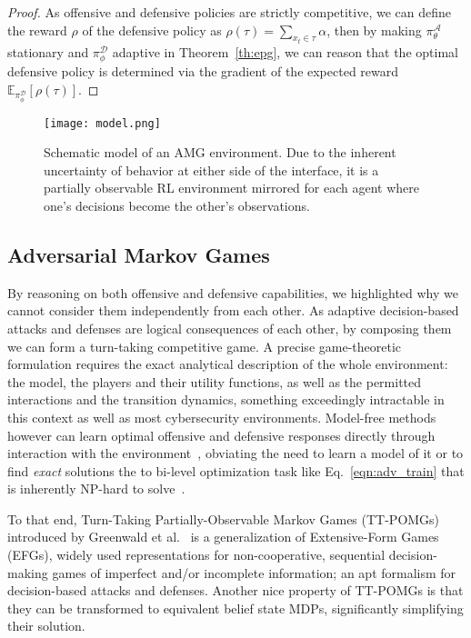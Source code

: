 \begin{proof}
As offensive and defensive policies are strictly competitive, we can define the reward $\rho$ of the defensive policy as $\rho(\tau) = \sum_{x_t \in \tau} \alpha$, then by making $\pi_\theta^\mathcal{A}$ stationary and $\pi_\phi^{\mathcal{D}}$ adaptive in Theorem~\ref{th:epg}, we can reason that the optimal defensive policy is determined via the gradient of the expected reward $\mathbb{E}_{\pi^\mathcal{D}_\phi}[\rho(\tau)]$.
\end{proof}

\begin{figure}
    \centering
    \texttt{[image: model.png]}
    \caption{Schematic model of an AMG environment. Due to the inherent uncertainty of behavior at either side of the interface, it is a partially observable RL environment mirrored for each agent where one's decisions become the other's observations.}
    \label{fig:model}
\end{figure}

\subsection{Adversarial Markov Games}
\label{sec:AMG}

By reasoning on both offensive and defensive capabilities, we highlighted why we cannot consider them independently from each other.
As adaptive decision-based attacks and defenses are logical consequences of each other, by composing them we can form a turn-taking competitive game.
A precise game-theoretic formulation requires the exact analytical description of the whole environment: the model, the players and their utility functions, as well as the permitted interactions and the transition dynamics, something exceedingly intractable in this context as well as most cybersecurity environments.
Model-free methods however can learn optimal offensive and defensive responses directly through interaction with the environment~\cite{sengupta2020multi, schulman2017proximal}, obviating the need to learn a model of it or to find \emph{exact} solutions the to bi-level optimization task like Eq.~\eqref{eqn:adv_train} that is inherently NP-hard to solve~\cite{bruckner2011stackelberg}.

To that end, Turn-Taking Partially-Observable Markov Games (TT-POMGs) introduced by Greenwald et al.~\cite{greenwald2017solving} is a generalization of Extensive-Form Games (EFGs), widely used representations for non-cooperative, sequential decision-making games of imperfect and/or incomplete information; an apt formalism for decision-based attacks and defenses.
Another nice property of TT-POMGs is that they can be transformed to equivalent belief state MDPs, significantly simplifying their solution.


